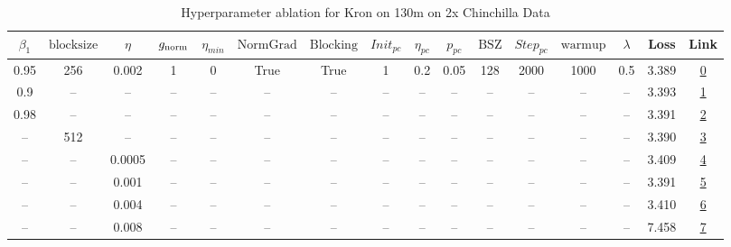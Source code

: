 \begin{table}[H]
\centering
\caption{Hyperparameter ablation for Kron on 130m on 2x Chinchilla Data}
\label{tab:ablation_kron_130m_on_2x_chinchilla_data}
\begin{tabular}{cccccccccccccccc}
\toprule
$\beta_1$ & $\mathrm{block size}$ & $\eta$ & $g_{\mathrm{norm}}$ & $\eta_{min}$ & $\mathrm{NormGrad}$ & $\mathrm{Blocking}$ & $Init_{pc}$ & $\eta_{pc}$ & $p_{pc}$ & $\mathrm{BSZ}$ & $Step_{pc}$ & $\mathrm{warmup}$ & $\lambda$ & Loss & Link \\
\midrule
0.95 & 256 & 0.002 & 1 & 0 & True & True & 1 & 0.2 & 0.05 & 128 & 2000 & 1000 & 0.5 & 3.389 & \href{https://wandb.ai/marin-community/optimizer-scaling/runs/sweep-130m-5B-kron45d4b7lr0.002-wd0.5-b10.95-plr0.2-pis1-gn1-nor-c54de5}{0} \\
\midrule
0.9 & -- & -- & -- & -- & -- & -- & -- & -- & -- & -- & -- & -- & -- & 3.393 & \href{https://wandb.ai/marin-community/optimizer-scaling/runs/sweep-130m-5B-kronc6e4f0lr0.002-wd0.5-b10.9-plr0.2-pis1-gn1-norm-b99f14}{1} \\
0.98 & -- & -- & -- & -- & -- & -- & -- & -- & -- & -- & -- & -- & -- & 3.391 & \href{https://wandb.ai/marin-community/optimizer-scaling/runs/sweep-130m-5B-kron446e3clr0.002-wd0.5-b10.98-plr0.2-pis1-gn1-nor-60f801}{2} \\
-- & 512 & -- & -- & -- & -- & -- & -- & -- & -- & -- & -- & -- & -- & 3.390 & \href{https://wandb.ai/marin-community/optimizer-scaling/runs/sweep-130m-5B-kron47f90elr0.002-wd0.5-b10.95-plr0.2-pis1-gn1-nor-50b12f}{3} \\
-- & -- & 0.0005 & -- & -- & -- & -- & -- & -- & -- & -- & -- & -- & -- & 3.409 & \href{https://wandb.ai/marin-community/optimizer-scaling/runs/sweep-130m-5B-kronc5113alr0.0005-wd0.5-b10.95-plr0.2-pis1-gn1-no-25eea5}{4} \\
-- & -- & 0.001 & -- & -- & -- & -- & -- & -- & -- & -- & -- & -- & -- & 3.391 & \href{https://wandb.ai/marin-community/optimizer-scaling/runs/sweep-130m-5B-kron0d84f8lr0.001-wd0.5-b10.95-plr0.2-pis1-gn1-nor-9cbb80}{5} \\
-- & -- & 0.004 & -- & -- & -- & -- & -- & -- & -- & -- & -- & -- & -- & 3.410 & \href{https://wandb.ai/marin-community/optimizer-scaling/runs/sweep-130m-5B-krone91591lr0.004-wd0.5-b10.95-plr0.2-pis1-gn1-nor-46e2ae}{6} \\
-- & -- & 0.008 & -- & -- & -- & -- & -- & -- & -- & -- & -- & -- & -- & 7.458 & \href{https://wandb.ai/marin-community/optimizer-scaling/runs/sweep-130m-5B-kron4e53f2lr0.008-wd0.5-b10.95-plr0.2-pis1-gn1-nor-6c3cc4}{7} \\

\end{tabular}
\end{table}
